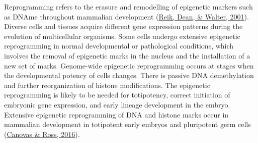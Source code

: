 \documentclass[12pt,twoside]{reedthesis}
\begin{document}
Reprogramming refers to the erasure and remodelling of epigenetic
markers such as DNAme throughout mammalian development (\protect\hyperlink{ref-reik2001}{Reik, Dean, \& Walter, 2001}).
Diverse cells and tissues acquire different gene expression patterns
during the evolution of multicellular organisms. Some cells undergo
extensive epigenetic reprogramming in normal developmental or
pathological conditions, which involves the removal of epigenetic marks
in the nucleus and the installation of a new set of marks. Genome-wide
epigenetic reprogramming occurs at stages when the developmental potency
of cells changes. There is passive DNA demethylation and further
reorganization of histone modifications. The epigenetic reprogramming is
likely to be needed for totipotency, correct initiation of embryonic
gene expression, and early lineage development in the embryo. Extensive
epigenetic reprogramming of DNA and histone marks occur in mammalian
development in totipotent early embryos and pluripotent germ cells
(\protect\hyperlink{ref-canovas2016}{Canovas \& Ross, 2016}).
\end{document}
